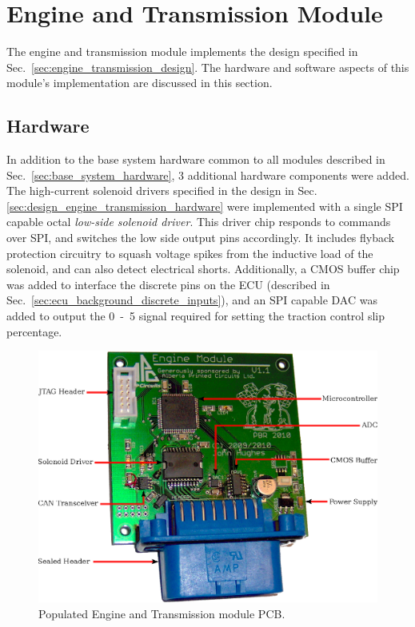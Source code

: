 \section{Engine and Transmission Module}

The engine and transmission module implements the design specified in Sec.\ \ref{sec:engine_transmission_design}. The hardware and software aspects of this module's implementation are discussed in this section.

\subsection{Hardware}

In addition to the base system hardware common to all modules described in Sec.\ \ref{sec:base_system_hardware}, 3 additional hardware components were added. The high-current solenoid drivers specified in the design in Sec. \ref{sec:design_engine_transmission_hardware} were implemented with a single SPI capable octal \emph{low-side solenoid driver}. This driver chip responds to commands over SPI, and switches the low side output pins accordingly. It includes flyback protection circuitry to squash voltage spikes from the inductive load of the solenoid, and can also detect electrical shorts. Additionally, a CMOS buffer chip was added to interface the discrete pins on the ECU (described in Sec.\ \ref{sec:ecu_background_discrete_inputs}), and an SPI capable DAC was added to output the \unit{0-5}{\volt} signal required for setting the traction control slip percentage.

\begin{figure}[H]
\centering
\includegraphics[scale=1]{implementation/figures/engine_transmission_pcb}
\caption{Populated Engine and Transmission module PCB.}
\label{fig:engine_transmission_pcb}
\end{figure}

